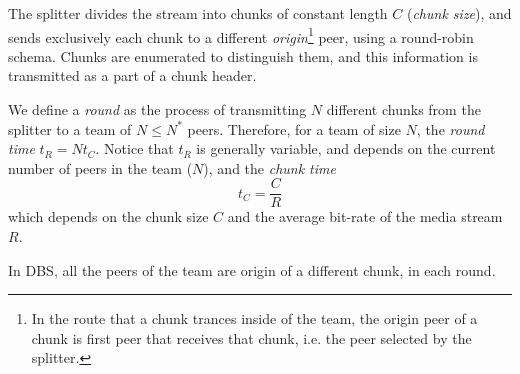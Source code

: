 

\label{sec:feeding_the_team}

The splitter divides the stream into chunks of constant length $C$
(\emph{chunk size}), and sends exclusively each chunk to a different
\emph{origin}\footnote{In the route that a chunk trances inside of the
  team, the origin peer of a chunk is first peer that receives that
  chunk, i.e. the peer selected by the splitter.} peer, using a
round-robin schema. Chunks are enumerated to distinguish them, and this
information is transmitted as a part of a chunk header.

\begin{comment}
More details about the implementation
are available in Fig.~\ref{fig:chunk_generation}.


\begin{figure*}
  \fig{500}{5cm}{DBS_splitter_feed} \caption{Chunk
    generation at the splitter and their transmission to the
    team.\label{fig:chunk_generation}}
\end{figure*}
\end{comment}

We define a \emph{round} as the process of transmitting $N$ different
chunks from the splitter to a team of $N\leq N^*$ peers. Therefore,
for a team of size $N$, the \emph{round time} $t_R=Nt_C$. Notice that
$t_R$ is generally variable, and depends on the current number of
peers in the team ($N$), and the \emph{chunk time}
\begin{equation}
  \label{eq:chunk_time}
  t_C=\frac{C}{R}
\end{equation}
which depends on the chunk size $C$ and the average bit-rate of the
media stream $R$.

In DBS, all the peers of the team are origin of a different chunk, in
each round.

\begin{comment}
(in a team) as the time necessary to send two consecutive chunks from
  the splitter (of such team) to the same peer, using the
  round-robing. This time is variable and depends on $|T|$, $C$, and
  the average bit-rate of the media, $A$.
\end{comment}

\begin{comment}
The round-time is defined by:
\begin{equation}
  \cal{r} = \cal{c}N.
  \label{eq:round_time}
\end{equation}
For example, if we use only one team of $N=256$ peers, a chunk size
$C=1024$~bytes, and a video of $1$~Mb/s, the round time is
\begin{displaymath}
  \cal{r} = \frac{1024\frac{\text{bytes}}{\text{chunk}}\times
    8\frac{\text{bits}}{\text{byte}}}{10^6\frac{\text{bits}}{\text{second}}}\times
  256 \approx 2.1~\text{seconds}.
\end{displaymath}
\end{comment}
